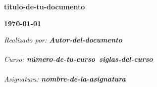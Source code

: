 \documentclass[a4paper, spanish, 11pt]{article} %
\newcommand{\autor}{Autor-del-documento} %
\newcommand{\fecha}{\today} %
\newcommand{\titulo}{titulo-de-tu-documento} %
\newcommand{\numerodecurso}{número-de-tu-curso} %
\newcommand{\siglascurso}{siglas-del-curso} %
\newcommand{\cursoconsiglas}{\numerodecurso\ \siglascurso} %
\newcommand{\asignatura}{nombre-de-la-asignatura} %
\newcommand{\fotoportada}{ruta-de-la-imagen} %
\begin{document}
    \begin{titlepage}
        \begin{center}
        {\Huge{\textbf{\titulo}}}
        \vfill
        \vfill
        \par\vspace{1cm}
        {\huge{\textbf{\fecha}}}
        \end{center}
        \vfill
        {\Large{\textit{Realizado por: \textbf{\autor}}}}
        \\\\
        {\Large{\textit{Curso: \textbf{\cursoconsiglas}}}}
        \\\\
        {\Large{\textit{Asignatura: \textbf{\asignatura}}}}
    \end{titlepage}
    \clearpage
    \tableofcontents
    \clearpage
    \pagestyle{fancy} %
    
\end{document}
